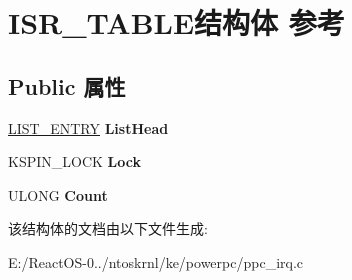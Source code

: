 \hypertarget{struct_i_s_r___t_a_b_l_e}{}\section{I\+S\+R\+\_\+\+T\+A\+B\+L\+E结构体 参考}
\label{struct_i_s_r___t_a_b_l_e}
\subsection*{Public 属性}
\begin{DoxyCompactItemize}
\item 
\mbox{\label{struct_i_s_r___t_a_b_l_e_a4ad857daffb6fc91b5979a6bc20b5616}} 
\hyperlink{struct___l_i_s_t___e_n_t_r_y}{L\+I\+S\+T\+\_\+\+E\+N\+T\+RY} {\bfseries List\+Head}
\item 
\mbox{\label{struct_i_s_r___t_a_b_l_e_a2bcf3a3238bbc7050bd01c0144875297}} 
K\+S\+P\+I\+N\+\_\+\+L\+O\+CK {\bfseries Lock}
\item 
\mbox{\label{struct_i_s_r___t_a_b_l_e_a92027f73ef49a1b5ad815452f72c207d}} 
U\+L\+O\+NG {\bfseries Count}
\end{DoxyCompactItemize}


该结构体的文档由以下文件生成\+:\begin{DoxyCompactItemize}
\item 
E\+:/\+React\+O\+S-\/0../ntoskrnl/ke/powerpc/ppc\+\_\+irq.\+c\end{DoxyCompactItemize}
